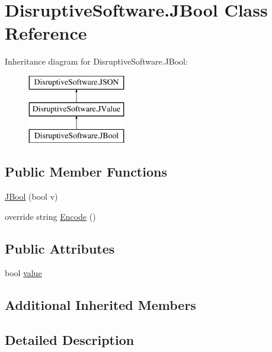 \hypertarget{class_disruptive_software_1_1_j_bool}{\section{Disruptive\+Software.\+J\+Bool Class Reference}
\label{class_disruptive_software_1_1_j_bool}
}
Inheritance diagram for Disruptive\+Software.\+J\+Bool\+:\begin{figure}[H]
\begin{center}
\leavevmode
\includegraphics[height=3.000000cm]{class_disruptive_software_1_1_j_bool}
\end{center}
\end{figure}
\subsection*{Public Member Functions}
\begin{DoxyCompactItemize}
\item 
\hyperlink{class_disruptive_software_1_1_j_bool_a89d7dbc957a7019265118bf9cc5f1422}{J\+Bool} (bool v)
\item 
override string \hyperlink{class_disruptive_software_1_1_j_bool_a0f81159498239e7cca41e006acaf964c}{Encode} ()
\end{DoxyCompactItemize}
\subsection*{Public Attributes}
\begin{DoxyCompactItemize}
\item 
bool \hyperlink{class_disruptive_software_1_1_j_bool_a637879ae8b9c3ef8a509fd59e6ce9d2e}{value}
\end{DoxyCompactItemize}
\subsection*{Additional Inherited Members}


\subsection{Detailed Description}


